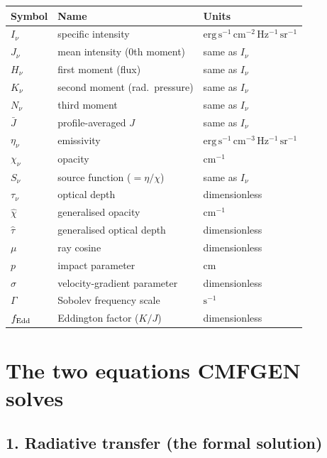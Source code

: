 \documentclass[11pt]{article}
\begin{document}
\begin{center}
\begin{tabular}{lll}
\toprule
Symbol & Name & Units \\
\midrule
$I_\nu$       & specific intensity        & $\mathrm{erg\,s^{-1}\,cm^{-2}\,Hz^{-1}\,sr^{-1}}$ \\
$J_\nu$       & mean intensity (0th moment) & same as $I_\nu$ \\
$H_\nu$       & first moment (flux)       & same as $I_\nu$ \\
$K_\nu$       & second moment (rad.\ pressure) & same as $I_\nu$ \\
$N_\nu$       & third moment              & same as $I_\nu$ \\
$\bar J$      & profile-averaged $J$      & same as $I_\nu$ \\
$\eta_\nu$    & emissivity                & $\mathrm{erg\,s^{-1}\,cm^{-3}\,Hz^{-1}\,sr^{-1}}$ \\
$\chi_\nu$    & opacity                   & $\mathrm{cm^{-1}}$ \\
$S_\nu$       & source function ($=\eta/\chi$) & same as $I_\nu$ \\
$\tau_\nu$    & optical depth             & dimensionless \\
$\hat\chi$    & generalised opacity       & $\mathrm{cm^{-1}}$ \\
$\hat\tau$    & generalised optical depth & dimensionless \\
$\mu$         & ray cosine                & dimensionless \\
$p$           & impact parameter          & cm \\
$\sigma$      & velocity-gradient parameter & dimensionless \\
$\Gamma$      & Sobolev frequency scale   & $\mathrm{s^{-1}}$ \\
$f_{\rm Edd}$ & Eddington factor ($K/J$)  & dimensionless \\
\bottomrule
\end{tabular}
\end{center}

\section{The two equations CMFGEN solves}
\label{sec:two-equations}

\subsection{1. Radiative transfer (the formal solution)}
\end{document}

